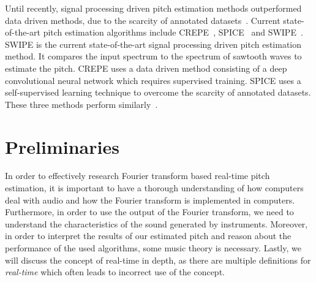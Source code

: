 \documentclass[a4paper,10pt,twocolumn]{article}
\begin{document}
Until recently, signal processing driven pitch estimation methods outperformed data driven methods, due to the scarcity of annotated datasets~\cite{SPICE}. Current state-of-the-art pitch estimation algorithms include CREPE~\cite{CREPE}, SPICE~\cite{SPICE} and SWIPE~\cite{SWIPE}. SWIPE is the current state-of-the-art signal processing driven pitch estimation method. It compares the input spectrum to the spectrum of sawtooth waves to estimate the pitch. CREPE uses a data driven method consisting of a deep convolutional neural network which requires supervised training. SPICE uses a self-supervised learning technique to overcome the scarcity of annotated datasets. These three methods perform similarly~\cite{SPICE}.





\section{Preliminaries}
In order to effectively research Fourier transform based real-time pitch estimation, it is important to have a thorough understanding of how computers deal with audio and how the Fourier transform is implemented in computers. Furthermore, in order to use the output of the Fourier transform, we need to understand the characteristics of the sound generated by instruments. Moreover, in order to interpret the results of our estimated pitch and reason about the performance of the used algorithms, some music theory is necessary. Lastly, we will discuss the concept of real-time in depth, as there are multiple definitions for \textit{real-time} which often leads to incorrect use of the concept.
\end{document}

